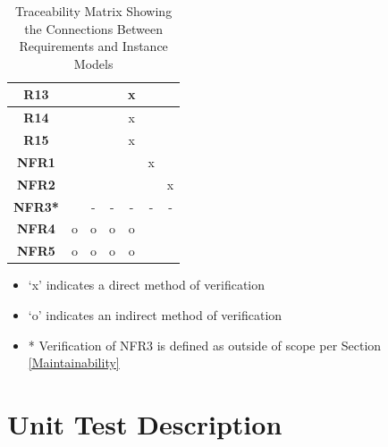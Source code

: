 \documentclass[12pt, titlepage]{article}
\begin{document}
\begin{table}[h!]
\begin{tabular}{|c|c|c|c|c|c|c|}
  \textbf{R13}  &                     &                     &                     & x                   &                     &                     \\ \hline
  \textbf{R14}  &                     &                     &                     & x                   &                     &                     \\ \hline
  \textbf{R15}  &                     &                     &                     & x                   &                     &                     \\ \hline
  \textbf{NFR1} &                     &                     &                     &                     & x                   &                     \\ \hline
  \textbf{NFR2} &                     &                     &                     &                     &                     & x                   \\ \hline
  \textbf{NFR3*}&                     & -                   & -                   & -                   & -                   & -                   \\ \hline
  \textbf{NFR4} & o                   & o                   & o                   & o                   &                     &                     \\ \hline
  \textbf{NFR5} & o                   & o                   & o                   & o                   &                     &                     \\ \hline
  \hline
  \end{tabular}
  \caption{Traceability Matrix Showing the Connections Between Requirements and Instance Models}
  \label{Table_R_trace}
\end{table}

\begin{itemize}
\item \lq x\rq{} indicates a direct method of verification
\item \lq o\rq{} indicates an indirect method of verification
\item * Verification of NFR3 is defined as outside of scope per Section \ref{Maintainability}
\end{itemize}


\section{Unit Test Description}\label{UTD}

\end{document}
